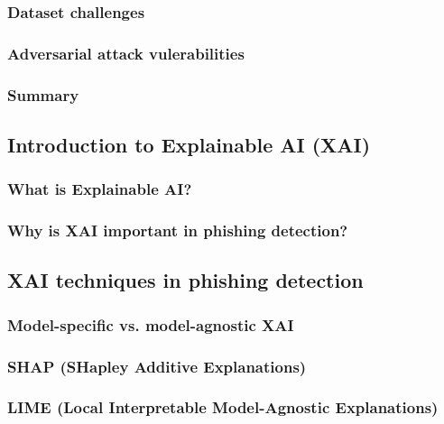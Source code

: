 \subsubsection*{Dataset challenges}

\subsubsection*{Adversarial attack vulerabilities}

\subsubsection*{Summary}

\newpage

\subsection*{Introduction to Explainable AI (XAI)}

\subsubsection*{What is Explainable AI?}

\subsubsection*{Why is XAI important in phishing detection?}

\newpage

\subsection*{XAI techniques in phishing detection}

\subsubsection*{Model-specific vs. model-agnostic XAI}

\subsubsection*{SHAP (SHapley Additive Explanations)}

\subsubsection*{LIME (Local Interpretable Model-Agnostic Explanations)}

